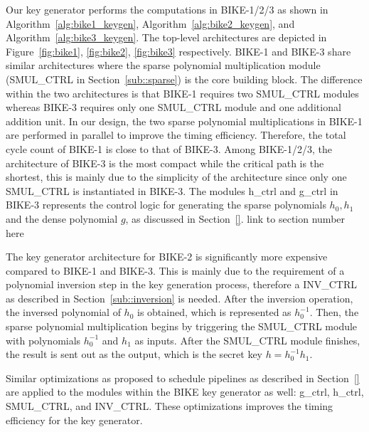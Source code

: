 \documentclass[runningheads]{llncs}
\begin{document}
Our key generator performs the computations in BIKE-1/2/3 as shown in Algorithm~\ref{alg:bike1_keygen}, Algorithm~\ref{alg:bike2_keygen}, and Algorithm~\ref{alg:bike3_keygen}. The top-level architectures are depicted in Figure~\ref{fig:bike1}, \ref{fig:bike2}, \ref{fig:bike3}
respectively. 
BIKE-1 and BIKE-3 share similar architectures
where the sparse polynomial multiplication module 
(SMUL\_CTRL in Section~\ref{sub::sparse}) is the core building block. 
The difference within the two architectures is that 
BIKE-1 requires two SMUL\_CTRL modules 
whereas BIKE-3 requires only one SMUL\_CTRL module and one additional
addition unit. 
In our design, the two sparse polynomial multiplications 
in BIKE-1 are performed in parallel to improve the 
timing efficiency. 
Therefore, the total cycle count of BIKE-1 
is close to that of BIKE-3. 
Among BIKE-1/2/3, the architecture of BIKE-3 is 
the most compact while the critical path is the shortest,
this is mainly due to the simplicity of the architecture
since only one SMUL\_CTRL is instantiated in BIKE-3. 
The modules h\_ctrl and g\_ctrl in BIKE-3 represents the
control logic for
generating the sparse polynomials $h_0,h_1$ and 
the dense polynomial $g$, as discussed in Section~\ref{}. {\color{red} link to section number here}

The key generator architecture for BIKE-2 
is significantly more expensive compared to 
BIKE-1 and BIKE-3.
This is mainly due to the requirement of a
polynomial inversion step in the key generation process,
therefore a INV\_CTRL as described in Section~\ref{sub::inversion} is needed. 
After the inversion operation, the inversed polynomial of
$h_0$ is obtained, which is represented as $h_0^{-1}$.
Then, the sparse polynomial multiplication begins
by triggering the SMUL\_CTRL module with polynomials
$h_0^{-1}$ and $h_1$ as inputs. 
After the SMUL\_CTRL module finishes,
the result is sent out as the output,
which is the secret key $h=h_0^{-1}h_1$.

Similar optimizations as proposed to schedule pipelines
as described in Section~\ref{} are applied to the 
modules within the BIKE key generator as well: 
g\_ctrl, h\_ctrl, SMUL\_CTRL, and INV\_CTRL.
These optimizations improves the timing efficiency for the
key generator. 
\end{document}
